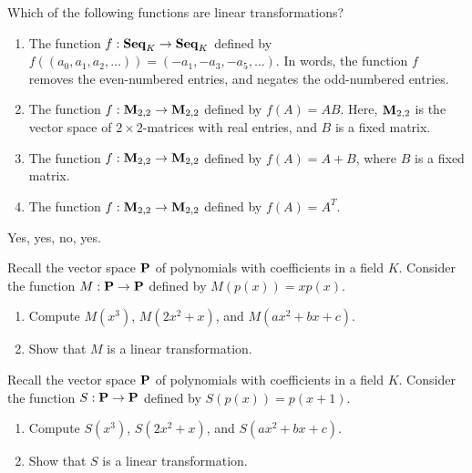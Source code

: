\begin{ex}
  Which of the following functions are linear transformations?
  \begin{enumerate}
  \item The function $f:\mathbf{Seq}_K\to\mathbf{Seq}_K$ defined by
    $f((a_0,a_1,a_2,\ldots)) = (-a_1,-a_3,-a_5,\ldots)$. In words, the
    function $f$ removes the even-numbered entries, and negates the
    odd-numbered entries.
  \item The function $f:\mathbf{M}_{2,2}\to\mathbf{M}_{2,2}$ defined by $f(A) =
    AB$. Here, $\mathbf{M}_{2,2}$ is the vector space of $2\times
    2$-matrices with real entries, and $B$ is a fixed matrix.
  \item The function $f:\mathbf{M}_{2,2}\to\mathbf{M}_{2,2}$ defined by $f(A) =
    A+B$, where $B$ is a fixed matrix.
  \item The function $f:\mathbf{M}_{2,2}\to\mathbf{M}_{2,2}$ defined by $f(A) =
    A^T$.
  \end{enumerate}
  \begin{sol}
    Yes, yes, no, yes.
  \end{sol}
\end{ex}

\begin{ex}
  Recall the vector space $\mathbf{P}$ of polynomials with coefficients in
  a field $K$. Consider the function $M:\mathbf{P}\to\mathbf{P}$ defined by
  $M(p(x)) = xp(x)$.
  \begin{enumerate}
  \item Compute $M(x^3)$, $M(2x^2+x)$, and $M(ax^2+bx+c)$.
  \item Show that $M$ is a linear transformation.
  \end{enumerate}
\end{ex}

\begin{ex}
  Recall the vector space $\mathbf{P}$ of polynomials with coefficients in
  a field $K$. Consider the function $S:\mathbf{P}\to\mathbf{P}$ defined by
  $S(p(x)) = p(x+1)$.
  \begin{enumerate}
  \item Compute $S(x^3)$, $S(2x^2+x)$, and $S(ax^2+bx+c)$.
  \item Show that $S$ is a linear transformation.
  \end{enumerate}
\end{ex}

